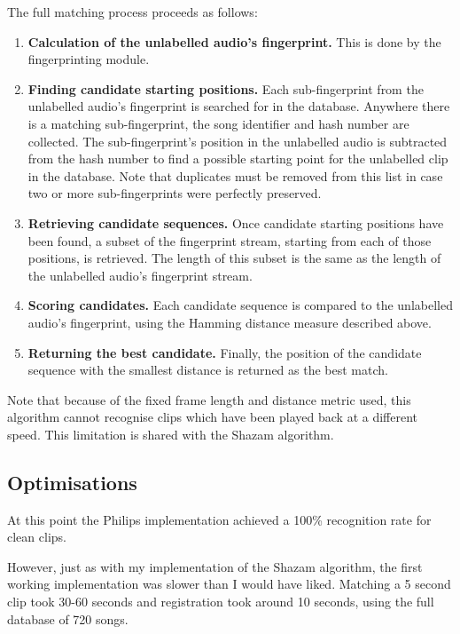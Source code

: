 \documentclass[12pt,a4paper,twoside,openright]{report}
\begin{document}
The full matching process proceeds as follows:

\begin{enumerate}

  \item \textbf{Calculation of the unlabelled audio's fingerprint.} This is done by the fingerprinting module.

  \item \textbf{Finding candidate starting positions.} Each sub-fingerprint from the unlabelled audio's fingerprint is searched for in the database. Anywhere there is a matching sub-fingerprint, the song identifier and hash number are collected. The sub-fingerprint's position in the unlabelled audio is subtracted from the hash number to find a possible starting point for the unlabelled clip in the database. Note that duplicates must be removed from this list in case two or more sub-fingerprints were perfectly preserved.

  \item \textbf{Retrieving candidate sequences.} Once candidate starting positions have been found, a subset of the fingerprint stream, starting from each of those positions, is retrieved. The length of this subset is the same as the length of the unlabelled audio's fingerprint stream.

  \item \textbf{Scoring candidates.} Each candidate sequence is compared to the unlabelled audio's fingerprint, using the Hamming distance measure described above.

  \item \textbf{Returning the best candidate.} Finally, the position of the candidate sequence with the smallest distance is returned as the best match.

\end{enumerate}

Note that because of the fixed frame length and distance metric used, this algorithm cannot recognise clips which have been played back at a different speed. This limitation is shared with the Shazam algorithm.

\subsection{Optimisations}

At this point the Philips implementation achieved a 100\% recognition rate for clean clips.

However, just as with my implementation of the Shazam algorithm, the first working implementation was slower than I would have liked. Matching a 5 second clip took 30-60 seconds and registration took around 10 seconds, using the full database of 720 songs.
\end{document}
